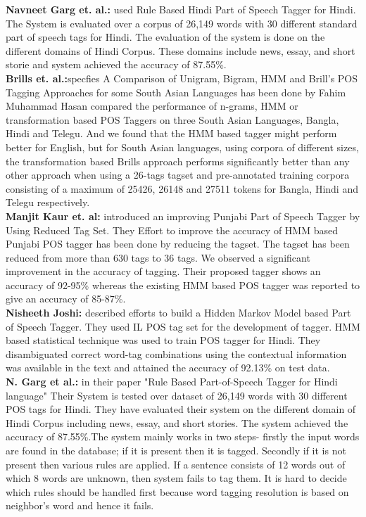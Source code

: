 \documentclass[12pt,a4paper,oneside]{memoir}
\begin{document}
\textbf{Navneet Garg et. al.:} used Rule Based Hindi Part of Speech Tagger for Hindi. The System is evaluated over a corpus of 26,149 words with 30 different standard part of speech tags for Hindi. The evaluation of the system is done on the different domains of Hindi Corpus. These domains include news, essay, and short storie and system achieved the accuracy of 87.55\%.\\

\textbf{Brills et. al.:}specfies A Comparison of Unigram, Bigram, HMM and Brill's POS Tagging Approaches for some South Asian Languages has been done by Fahim Muhammad Hasan compared the performance of n-grams, HMM or transformation based POS Taggers on three South Asian Languages, Bangla, Hindi and Telegu. And we found that the HMM based tagger might perform better for English, but for South Asian languages, using corpora of different sizes, the transformation based Brills approach performs significantly better than any other approach when using a 26-tags tagset and pre-annotated training corpora consisting of a maximum of 25426, 26148 and 27511 tokens for Bangla, Hindi and Telegu respectively.\\

\textbf{Manjit Kaur et. al:} introduced an improving Punjabi Part of Speech Tagger by Using Reduced Tag Set. They Effort to improve the accuracy of HMM based Punjabi POS tagger has been done by reducing the tagset. The tagset has been reduced from more than 630 tags to 36 tags. We observed a significant improvement in the accuracy of tagging. Their proposed tagger shows an accuracy of 92-95\% whereas the existing HMM based POS tagger was reported to give an accuracy of 85-87\%.\\

\textbf{Nisheeth Joshi:} described efforts to build a Hidden Markov Model based Part of Speech Tagger. They used IL POS tag set for the development of tagger. HMM based statistical technique was used to train POS tagger for Hindi. They disambiguated correct word-tag combinations using the contextual information was available in the text and attained the accuracy of 92.13\% on test data.\\

\textbf{N. Garg et al.:} in their paper "Rule Based Part-of-Speech Tagger for Hindi language" Their System is tested over dataset of 26,149 words with 30 different POS tags for Hindi. They have evaluated their system on the different domain of Hindi Corpus including news, essay, and short stories. The system achieved the accuracy of 87.55\%.The system mainly works in two steps- firstly the input words are found in the database; if it is present then it is tagged. Secondly if it is not present then various rules are applied. If a sentence consists of 12 words out of which 8 words are unknown, then system fails to tag them. It is hard to decide which rules should be handled first because word tagging resolution is based on neighbor’s word and hence it fails.
\end{document}
